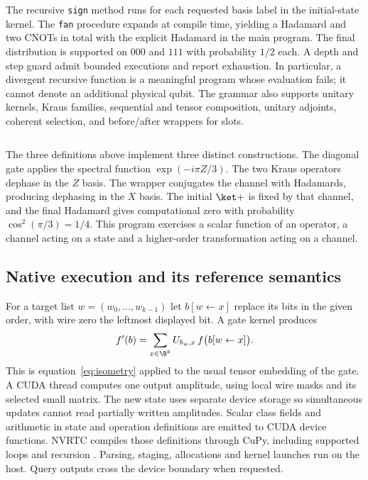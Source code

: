 \inputminted[fontsize=\footnotesize]{qaf}{examples/prefix/recursion.qaf}
The recursive \texttt{sign} method runs for each requested basis label in the initial-state kernel. The \texttt{fan} procedure expands at compile time, yielding a Hadamard and two CNOTs in total with the explicit Hadamard in the main program. The final distribution is supported on $000$ and $111$ with probability $1/2$ each. A depth and step guard admit bounded executions and report exhaustion. In particular, a divergent recursive function is a meaningful program whose evaluation fails; it cannot denote an additional physical qubit. The grammar also supports unitary kernels, Kraus families, sequential and tensor composition, unitary adjoints, coherent selection, and before/after wrappers for slots.

\inputminted{qaf}{examples/prefix/functions.qaf}
The three definitions above implement three distinct constructions. The diagonal gate applies the spectral function $\exp(-i\pi Z/3)$. The two Kraus operators dephase in the $Z$ basis. The wrapper conjugates the channel with Hadamards, producing dephasing in the $X$ basis. The initial $\ket+$ is fixed by that channel, and the final Hadamard gives computational zero with probability $\cos^2(\pi/3)=1/4$. This program exercises a scalar function of an operator, a channel acting on a state and a higher-order transformation acting on a channel.

\subsection{Native execution and its reference semantics}
For a target list $w=(w_0,\ldots,w_{k-1})$ let $b[w\leftarrow x]$ replace its bits in the given order, with wire zero the leftmost displayed bit. A gate kernel produces
\[
 f'(b)=\sum_{x\in\B^k}U_{b_w,x}\,f\bigl(b[w\leftarrow x]\bigr).
\]
This is equation~\eqref{eq:isometry} applied to the usual tensor embedding of the gate. A CUDA thread computes one output amplitude, using local wire masks and its selected small matrix. The new state uses separate device storage so simultaneous updates cannot read partially written amplitudes. Scalar class fields and arithmetic in state and operation definitions are emitted to CUDA device functions. NVRTC compiles those definitions through CuPy, including supported loops and recursion \cite{cupy}. Parsing, staging, allocations and kernel launches run on the host. Query outputs cross the device boundary when requested.

